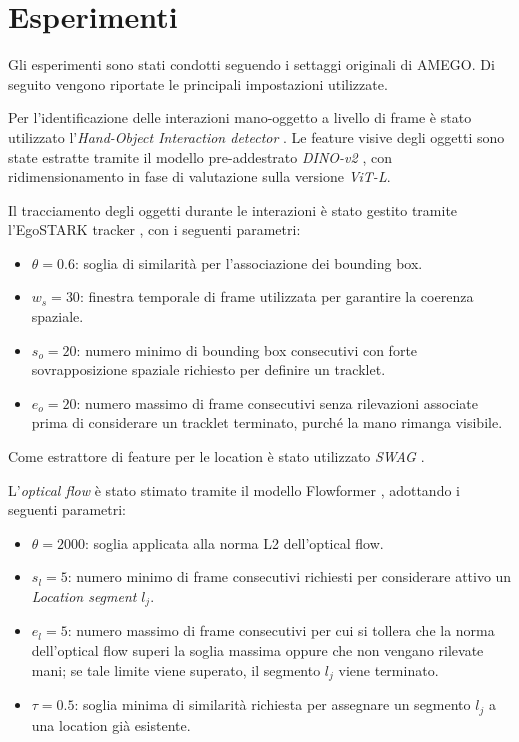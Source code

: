 \chapter{Esperimenti}
\label{cap:Esperimenti}
Gli esperimenti sono stati condotti seguendo i settaggi originali di AMEGO. Di seguito vengono riportate le principali impostazioni utilizzate.

Per l'identificazione delle interazioni mano-oggetto a livello di frame è stato utilizzato l'\emph{Hand-Object Interaction detector} \cite{shan2020understandinghumanhandscontact}.  
Le feature visive degli oggetti sono state estratte tramite il modello pre-addestrato \emph{DINO-v2} \cite{oquab2024dinov2learningrobustvisual}, con ridimensionamento in fase di valutazione sulla versione \emph{ViT-L}.  

Il tracciamento degli oggetti durante le interazioni è stato gestito tramite l'EgoSTARK tracker \cite{tang2023egotrackslongtermegocentricvisual}, con i seguenti parametri:

\begin{itemize}
    \item $\theta = 0.6$: soglia di similarità per l'associazione dei bounding box.
    \item $w_s = 30$: finestra temporale di frame utilizzata per garantire la coerenza spaziale.
    \item $s_o = 20$: numero minimo di bounding box consecutivi con forte sovrapposizione spaziale richiesto per definire un tracklet.
    \item $e_o = 20$: numero massimo di frame consecutivi senza rilevazioni associate prima di considerare un tracklet terminato, purché la mano rimanga visibile.
\end{itemize}

Come estrattore di feature per le location è stato utilizzato \emph{SWAG} \cite{singh2022revisitingweaklysupervisedpretraining}.

L'\emph{optical flow} è stato stimato tramite il modello Flowformer \cite{huang2022flowformertransformerarchitectureoptical}, adottando i seguenti parametri:

\begin{itemize}
    \item $\theta = 2000$: soglia applicata alla norma L2 dell'optical flow.
    \item $s_l = 5$: numero minimo di frame consecutivi richiesti per considerare attivo un \emph{Location segment} $l_j$.
    \item $e_l = 5$: numero massimo di frame consecutivi per cui si tollera che 
    la norma dell'optical flow superi la soglia massima oppure che non vengano 
    rilevate mani; se tale limite viene superato, il segmento $l_j$ viene terminato.
    \item $\tau = 0.5$: soglia minima di similarità richiesta per assegnare un segmento $l_j$ a una location già esistente.
\end{itemize}

